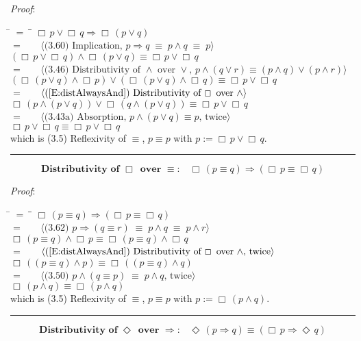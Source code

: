 \documentclass[12pt, fleqn, leqno]{article}
\newcommand{\lgap}{2pt}                             %
\newcommand{\mymathindent}{24pt}                    %
\newcommand{\equivs}{\ensuremath{\;\equiv\;}}       %
\newcommand{\impl}{\ensuremath{\Rightarrow}}        %
\newcommand{\Event}{\Diamond\,}
\newcommand{\Always}{\Box\,}
\newcommand{\myqed}{\rule[-.23ex]{1.2ex}{2.0ex}}
\newcommand{\myqedtab}{\hspace{384pt}}              %
\newcommand{\Gll} {\langle}                         %
\newcommand{\Ggg} {\rangle}                         %
\newcommand{\Hint}[1]     {\ \ \ $\Gll              \mbox{#1} \Ggg$ }   %
\begin{document}
\emph{Proof}:
\begin{tabbing}
\hspace{\mymathindent} \= $= \;$ \= \myqedtab \= \kill
  \> \>   $\Always p \lor \Always q \impl \Always(p \lor q)$\\[\lgap]
  \> $=$  \>  \Hint{(3.60) Implication, $p\impl q \equivs p\land q \equivs p$}\\[\lgap]
  \> \>   $(\Always p \lor \Always q) \land \Always(p \lor q) \equiv \Always p \lor \Always q$\\[\lgap]
  \> $=$  \>  \Hint{(3.46) Distributivity of $\land$ over $\lor$, $p\land (q\lor r)\equiv (p\land q)\lor (p\land r)$}\\[\lgap]
  \> \>   $(\Always (p \lor q) \land \Always p) \lor (\Always (p \lor q) \land \Always q) \equiv \Always p \lor \Always q$\\[\lgap]
  \> $=$  \>  \Hint{(\ref{E:distAlwaysAnd}) Distributivity of $\Always$ over $\land$}\\[\lgap]
  \> \>   $\Always(p \land (p \lor q)) \lor \Always(q \land (p \lor q)) \equiv \Always p \lor \Always q$\\[\lgap]
  \> $=$  \>  \Hint{(3.43a) Absorption, $p \land (p \lor q) \equiv p$, twice}\\[\lgap]
  \> \>   $\Always p \lor \Always q \equiv \Always p \lor \Always q$\\[\lgap]
  \> which is (3.5) Reflexivity of $\equiv$, $p\equiv p$ with $p:=\Always p \lor \Always q$. \quad \myqed
\end{tabbing}
\begin{equation}\label{E:distAlwaysEquiv}
\textbf{Distributivity of $\Always$ over $\equiv$:}\quad \Always (p \equiv q) \impl (\Always p \equiv \Always q)
\end{equation}

\emph{Proof}:
\begin{tabbing}
\hspace{\mymathindent} \= $= \;$ \= \myqedtab \= \kill
  \> \>   $\Always (p \equiv q) \impl (\Always p \equiv \Always q)$\\[\lgap]
  \> $=$  \>  \Hint{(3.62) $p\impl (q\equiv r) \equivs p\land q\equivs p\land r$}\\[\lgap]
  \> \>   $\Always (p \equiv q) \land \Always p \equiv \Always (p \equiv q) \land \Always q$\\[\lgap]
  \> $=$  \>  \Hint{(\ref{E:distAlwaysAnd}) Distributivity of $\Always$ over $\land$, twice}\\[\lgap]
  \> \>   $\Always((p \equiv q) \land p) \equiv \Always((p \equiv q) \land q)$\\[\lgap]
  \> $=$  \>  \Hint{(3.50) $p\land (q\equiv p)\equivs p\land q$, twice}\\[\lgap]
  \> \>   $\Always(p \land q) \equiv \Always (p \land q)$\\[\lgap]
  \> which is (3.5) Reflexivity of $\equiv$, $p\equiv p$ with $p:=\Always(p \land q)$. \quad \myqed
\end{tabbing}
\begin{equation}\label{E:eventImpAlways}
\textbf{Distributivity of $\Event$ over $\impl$:}\quad \Event (p \impl q) \equiv (\Always p \impl \Event q)
\end{equation}
\end{document}
